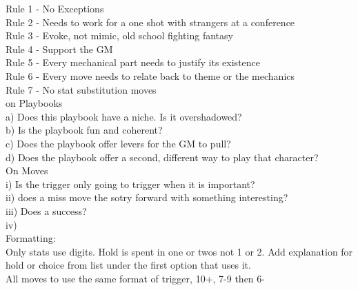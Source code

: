 \documentclass{tufte-book}
\begin{document}
Rule 1 - No Exceptions\\
Rule 2 - Needs to work for a one shot with strangers at a conference\\
Rule 3 - Evoke, not mimic, old school fighting fantasy\\
Rule 4 - Support the GM\\
Rule 5 - Every mechanical part needs to justify its existence\\
Rule 6 - Every move needs to relate back to theme or the mechanics\\
Rule 7 - No stat substitution moves\\

on Playbooks\\
a) Does this playbook have a niche. Is it overshadowed?\\
b) Is the playbook fun and coherent?\\
c) Does the playbook offer levers for the GM to pull?\\
d) Does the playbook offer a second, different way to play that character?\\

On Moves\\
i) Is the trigger only going to trigger when it is important?\\
ii) does a miss move the sotry forward with something interesting?\\
iii) Does a success?\\
iv) \\

Formatting:\\
Only stats use digits. Hold is spent in one or twos not 1 or 2. Add explanation for hold or choice from list under the first option that uses it.\\
All moves to use the same format of trigger, 10+, 7-9 then 6-\\









\backmatter




\printindex[stuff]

\printindex
\end{document}
